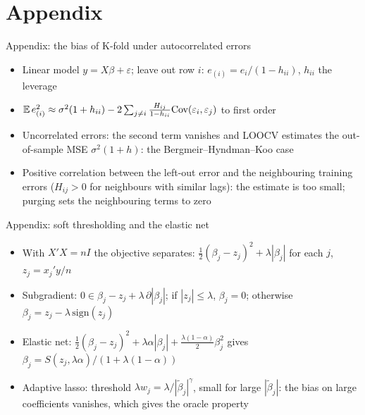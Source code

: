 \section{Appendix}

\begin{frame}{Appendix: the bias of K-fold under autocorrelated errors}
\hypertarget{atsapp1}{}
\itemsize{\small}
\begin{itemize}
    \item Linear model $y = X\beta + \varepsilon$; leave out row $i$: $e_{(i)} = e_i/(1 - h_{ii})$, $h_{ii}$ the leverage
    \item $\mathbb{E}\,e_{(i)}^2 \approx \sigma^2(1 + h_{ii}) - 2\sum_{j\ne i}\frac{H_{ij}}{1 - h_{ii}}\text{Cov}(\varepsilon_i, \varepsilon_j)$ to first order
    \item Uncorrelated errors: the second term vanishes and LOOCV estimates the out-of-sample MSE $\sigma^2(1 + h)$: the Bergmeir--Hyndman--Koo case
    \item Positive correlation between the left-out error and the neighbouring training errors ($H_{ij} > 0$ for neighbours with similar lags): the estimate is too small; purging sets the neighbouring terms to zero
\end{itemize}
\end{frame}

\begin{frame}{Appendix: soft thresholding and the elastic net}
\hypertarget{atsapp2}{}
\itemsize{\small}
\begin{itemize}
    \item With $X'X = nI$ the objective separates: $\frac12(\beta_j - z_j)^2 + \lambda|\beta_j|$ for each $j$, $z_j = x_j'y/n$
    \item Subgradient: $0 \in \beta_j - z_j + \lambda\,\partial|\beta_j|$; if $|z_j| \le \lambda$, $\beta_j = 0$; otherwise $\beta_j = z_j - \lambda\,\mathrm{sign}(z_j)$
    \item Elastic net: $\frac12(\beta_j - z_j)^2 + \lambda\alpha|\beta_j| + \frac{\lambda(1 - \alpha)}2\beta_j^2$ gives $\beta_j = S(z_j, \lambda\alpha)/(1 + \lambda(1 - \alpha))$
    \item Adaptive lasso: threshold $\lambda w_j = \lambda/|\tilde\beta_j|^\gamma$, small for large $|\tilde\beta_j|$: the bias on large coefficients vanishes, which gives the oracle property
\end{itemize}
\end{frame}


